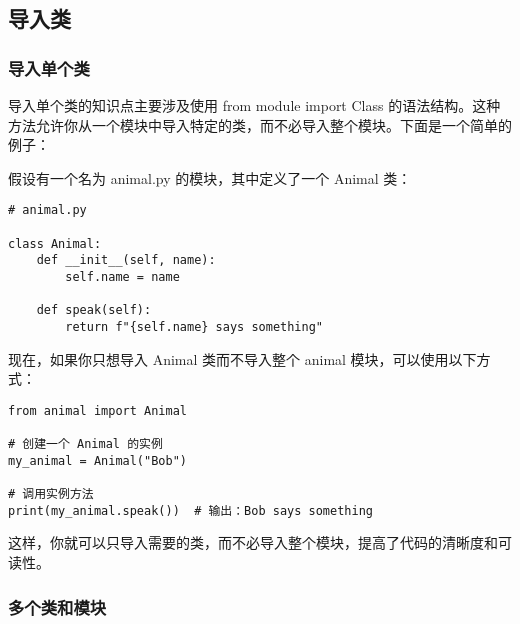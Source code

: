 \documentclass{article}
\begin{document}
\subsection{导入类}
\subsubsection{导入单个类}
导入单个类的知识点主要涉及使用 from module import Class 的语法结构。这种方法允许你从一个模块中导入特定的类，而不必导入整个模块。下面是一个简单的例子：

假设有一个名为 animal.py 的模块，其中定义了一个 Animal 类：
\begin{lstlisting}[caption={示例Python代码}]
# animal.py

class Animal:
    def __init__(self, name):
        self.name = name

    def speak(self):
        return f"{self.name} says something"
\end{lstlisting}

现在，如果你只想导入 Animal 类而不导入整个 animal 模块，可以使用以下方式：
\begin{lstlisting}[caption={示例Python代码}]
from animal import Animal

# 创建一个 Animal 的实例
my_animal = Animal("Bob")

# 调用实例方法
print(my_animal.speak())  # 输出：Bob says something
\end{lstlisting}
这样，你就可以只导入需要的类，而不必导入整个模块，提高了代码的清晰度和可读性。
\subsubsection{多个类和模块}
\end{document}
